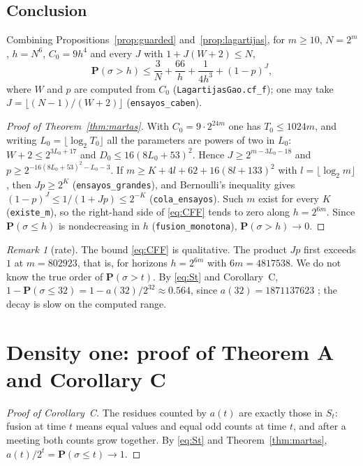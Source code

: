 \documentclass[11pt]{amsart}
\theoremstyle{definition}
\theoremstyle{remark}
\newtheorem{remark}[theorem]{Remark}
\newcommand{\Prob}{\mathbf{P}}
\newcommand{\lean}[1]{\nolinkurl{#1}}
\begin{document}
\subsection{Conclusion}
Combining Propositions~\ref{prop:guarded} and~\ref{prop:lagartijas}, for $m\ge10$, $N=2^m$, $h=N^6$, $C_0=9h^4$ and every $J$ with $1+J(W+2)\le N$,
\begin{equation}\label{eq:CFF}
\Prob(\sigma>h)\le \frac3N+\frac{66}{h}+\frac1{4h^3}+(1-p)^J,
\end{equation}
where $W$ and $p$ are computed from $C_0$ (\lean{LagartijasGao.cf_f}); one may take $J=\lfloor (N-1)/(W+2)\rfloor$ (\lean{ensayos_caben}).

\begin{proof}[Proof of Theorem~\ref{thm:martas}]
With $C_0=9\cdot2^{24m}$ one has $T_0\le 1024m$, and writing $L_0=\lfloor\log_2T_0\rfloor$ all the parameters are powers of two in $L_0$: $W+2\le 2^{3L_0+17}$ and $D_0\le 16(8L_0+53)^2$. Hence $J\ge 2^{m-3L_0-18}$ and $p\ge 2^{-16(8L_0+53)^2-L_0-3}$. If $m\ge K+4l+62+16(8l+133)^2$ with $l=\lfloor\log_2 m\rfloor$, then $Jp\ge2^K$ (\lean{ensayos_grandes}), and Bernoulli's inequality gives $(1-p)^J\le 1/(1+Jp)\le 2^{-K}$ (\lean{cola_ensayos}). Such $m$ exist for every $K$ (\lean{existe_m}), so the right-hand side of \eqref{eq:CFF} tends to zero along $h=2^{6m}$. Since $\Prob(\sigma\le h)$ is nondecreasing in $h$ (\lean{fusion_monotona}), $\Prob(\sigma>h)\to0$.
\end{proof}

\begin{remark}[rate]\label{rem:rate}
The bound \eqref{eq:CFF} is qualitative. The product $Jp$ first exceeds $1$ at $m=802923$, that is, for horizons $h=2^{6m}$ with $6m=4817538$. We do not know the true order of $\Prob(\sigma>t)$. By \eqref{eq:St} and Corollary~C, $1-\Prob(\sigma\le 32)=1-a(32)/2^{32}\approx0.564$, since $a(32)=1871137623$ \cite{OEIS}; the decay is slow on the computed range.
\end{remark}

\section{Density one: proof of Theorem A and Corollary C}\label{sec:density}

\begin{proof}[Proof of Corollary~C]
The residues counted by $a(t)$ are exactly those in $S_t$: fusion at time $t$ means equal values and equal odd counts at time $t$, and after a meeting both counts grow together. By \eqref{eq:St} and Theorem~\ref{thm:martas}, $a(t)/2^t=\Prob(\sigma\le t)\to1$.
\end{proof}
\end{document}
